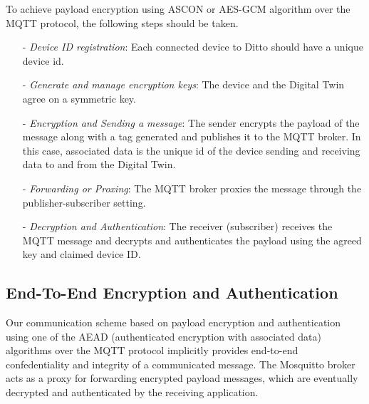 To achieve payload encryption using ASCON or AES-GCM algorithm over the MQTT protocol, the following steps should be taken. 
\begin{itemize}
    \item[-] \textit{Device ID registration}: Each connected device to Ditto should have a unique device id. 
    \item[-] \textit{Generate and manage encryption keys}: The device and the Digital Twin agree on a symmetric key. 
    \item[-] \textit{Encryption and Sending a message}: The sender encrypts the payload of the message along with a tag generated and publishes it to the MQTT broker. In this case, associated data is the unique id of the device sending and receiving data to and from the Digital Twin. 
    \item[-] \textit{Forwarding or Proxing}: The MQTT broker proxies the message through the publisher-subscriber setting. 
    \item[-] \textit{Decryption and Authentication}: The receiver (subscriber) receives the MQTT message and decrypts and authenticates the payload using the agreed key and claimed device ID.
    
\end{itemize}


\subsection{End-To-End Encryption and Authentication}
Our communication scheme based on payload encryption and authentication using one of the AEAD (authenticated encryption with associated data) algorithms over the MQTT protocol implicitly provides end-to-end confedentiality and integrity of a communicated message. The Mosquitto broker acts as a proxy for forwarding encrypted payload messages, which are eventually decrypted and authenticated by the receiving application. 